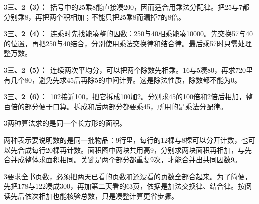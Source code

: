 \documentclass[multi=snippet,border={5bp 20bp 5bp 5bp}]{standalone}
\newenvironment{snippet}[3]{\begin{minipage}{#1bp}\color{answerred}\fontsize{#2}{#3}\selectfont\raggedright}{\end{minipage}}
\begin{document}
\begin{snippet}{505}{11.5}{14}\begin{multicols}{3}\raggedcolumns \textbf{三、2（3）：}\ 括号中的25乘8能直接凑200，因而适合用乘法分配律。把25与7都分别乘8，再把两个积相加；不能只把25乘8而漏掉7的8倍。\end{multicols}\end{snippet}
\begin{snippet}{505}{11.5}{14}\begin{multicols}{3}\raggedcolumns \textbf{三、2（4）：}\ 连乘时先找能凑整的因数：250与40相乘能凑10000。先交换57与40的位置，再把250与40结合，分别使用乘法交换律和结合律。最后乘57时只需处理整万数。\end{multicols}\end{snippet}
\begin{snippet}{505}{11.5}{14}\begin{multicols}{3}\raggedcolumns \textbf{三、2（5）：}\ 连续两次平均分，可以把两个除数先相乘。16与5凑80，再求720里有几个80，避免先求45后再除5的中间计算。这是除法性质，除数都不能为0。\end{multicols}\end{snippet}
\begin{snippet}{505}{11.5}{14}\begin{multicols}{3}\raggedcolumns \textbf{三、2（6）：}\ 102接近100，把它拆成100加2。分别求45的100倍和2倍后相加，整百倍的部分便于口算。拆成和后两部分都要乘45，所用的是乘法分配律。\end{multicols}\end{snippet}
\begin{snippet}{505}{11.5}{14}\begin{multicols}{3}\raggedcolumns 两种算法求的是同一个长方形的面积。\par 两种表示要说明数的是同一批物品：9行里，每行的12棵与8棵可以分开计数，也可以先合成每行20棵再计数。面积图中两块共用高9，分别求两块面积再相加，与先合并成整体求面积相同。关键是两个部分都重复9次，才能合并出共同因数9。\end{multicols}\end{snippet}
\begin{snippet}{505}{11.5}{14}\begin{multicols}{3}\raggedcolumns 要求全书页数，必须把两天已看的页数和还没看的页数全部合起来。为了简便，先把178与122凑成300，再加第二天看的63页，依据是加法交换律、结合律。按阅读先后依次相加也能核验总数，只是凑整计算更省步骤。\end{multicols}\end{snippet}
\end{document}
